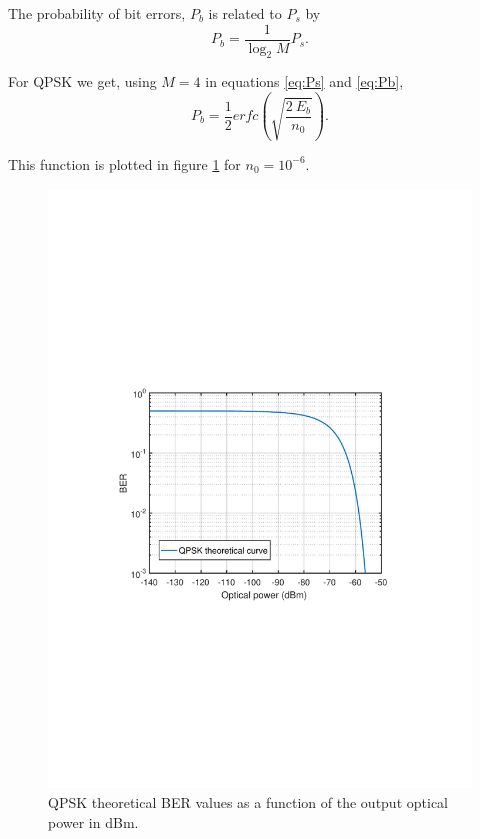 The probability of bit errors, $P_b$ is related to $P_s$ by
\begin{equation}
	P_b=\frac{1}{\log_2 M}P_s.
	\label{eq:Pb}
\end{equation}

For QPSK we get, using $M=4$ in equations \ref{eq:Ps} and \ref{eq:Pb},
\begin{equation}
	P_b=\frac{1}{2} erfc\left(\sqrt{\frac{2~E_b}{n_0}}\right).
\end{equation}

This function is plotted in figure \ref{fig:QPSK_th_curve} for $n_0=10^{-6}$.

\begin{figure}[h]
		\centering
		\includegraphics[clip, trim=0.5cm 9cm 0.5cm 9cm, width=\textwidth]{./sdf/m_qam_system/figures/BER_QPSK_theory.pdf}
		\caption{QPSK theoretical BER values as a function of the output optical power in dBm.}
		\label{fig:QPSK_th_curve}
\end{figure}


